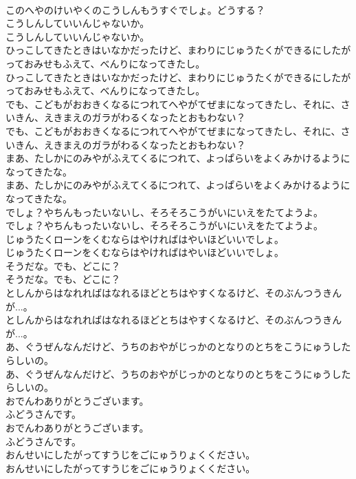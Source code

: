 \documentclass[8pt]{extreport}
\begin{document}
\begin{CJK}{UTF8}{min}
\\	このへやのけいやくのこうしんもうすぐでしょ。どうする？
\\	こうしんしていいんじゃないか。
\\	こうしんしていいんじゃないか。
\\	ひっこしてきたときはいなかだったけど、まわりにじゅうたくができるにしたがっておみせもふえて、べんりになってきたし。
\\	ひっこしてきたときはいなかだったけど、まわりにじゅうたくができるにしたがっておみせもふえて、べんりになってきたし。
\\	でも、こどもがおおきくなるにつれてへやがてぜまになってきたし、それに、さいきん、えきまえのガラがわるくなったとおもわない？
\\	でも、こどもがおおきくなるにつれてへやがてぜまになってきたし、それに、さいきん、えきまえのガラがわるくなったとおもわない？
\\	まあ、たしかにのみやがふえてくるにつれて、よっぱらいをよくみかけるようになってきたな。
\\	まあ、たしかにのみやがふえてくるにつれて、よっぱらいをよくみかけるようになってきたな。
\\	でしょ？やちんもったいないし、そろそろこうがいにいえをたてようよ。
\\	でしょ？やちんもったいないし、そろそろこうがいにいえをたてようよ。
\\	じゅうたくローンをくむならはやければはやいほどいいでしょ。
\\	じゅうたくローンをくむならはやければはやいほどいいでしょ。
\\	そうだな。でも、どこに？
\\	そうだな。でも、どこに？
\\	としんからはなれればはなれるほどとちはやすくなるけど、そのぶんつうきんが...。
\\	としんからはなれればはなれるほどとちはやすくなるけど、そのぶんつうきんが...。
\\	あ、ぐうぜんなんだけど、うちのおやがじっかのとなりのとちをこうにゅうしたらしいの。
\\	あ、ぐうぜんなんだけど、うちのおやがじっかのとなりのとちをこうにゅうしたらしいの。
\\	おでんわありがとうございます。
\\	ふどうさんです。
\\	おでんわありがとうございます。
\\	ふどうさんです。
\\	おんせいにしたがってすうじをごにゅうりょくください。
\\	おんせいにしたがってすうじをごにゅうりょくください。

\end{CJK}
\end{document}
